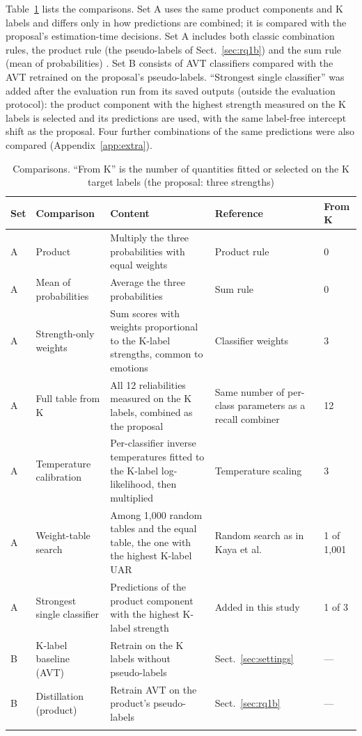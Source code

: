 Table~\ref{tab:comparators} lists the comparisons. Set A uses the same product components and K labels and differs only in how predictions are combined; it is compared with the proposal's estimation-time decisions. Set A includes both classic combination rules, the product rule (the pseudo-labels of Sect.~\ref{sec:rq1b}) and the sum rule (mean of probabilities) \cite{kittler1998}. Set B consists of AVT classifiers compared with the AVT retrained on the proposal's pseudo-labels. ``Strongest single classifier'' was added after the evaluation run from its saved outputs (outside the evaluation protocol): the product component with the highest strength measured on the K labels is selected and its predictions are used, with the same label-free intercept shift as the proposal. Four further combinations of the same predictions were also compared (Appendix~\ref{app:extra}).

\begin{table}[t]
\caption{Comparisons. ``From K'' is the number of quantities fitted or selected on the K target labels (the proposal: three strengths)}\label{tab:comparators}
\footnotesize\setlength{\tabcolsep}{4pt}
\begin{tabular}{@{}lp{2.8cm}p{4.0cm}p{2.5cm}l@{}}
\toprule
Set & Comparison & Content & Reference & From K \\
\midrule
A & Product & Multiply the three probabilities with equal weights & Product rule \cite{kittler1998} & 0 \\
A & Mean of probabilities & Average the three probabilities & Sum rule \cite{kittler1998} & 0 \\
A & Strength-only weights & Sum scores with weights proportional to the K-label strengths, common to emotions & Classifier weights \cite{kuncheva2014} & 3 \\
A & Full table from K & All 12 reliabilities measured on the K labels, combined as the proposal & Same number of per-class parameters as a recall combiner \cite{kuncheva2014} & 12 \\
A & Temperature calibration & Per-classifier inverse temperatures fitted to the K-label log-likelihood, then multiplied & Temperature scaling \cite{guo2017calibration} & 3 \\
A & Weight-table search & Among 1,000 random tables and the equal table, the one with the highest K-label UAR & Random search as in Kaya et al.\ \cite{kaya2017} & 1 of 1,001 \\
A & Strongest single classifier & Predictions of the product component with the highest K-label strength & Added in this study & 1 of 3 \\
B & K-label baseline (AVT) & Retrain on the K labels without pseudo-labels & Sect.~\ref{sec:settings} & --- \\
B & Distillation (product) & Retrain AVT on the product's pseudo-labels & Sect.~\ref{sec:rq1b} & --- \\
\botrule
\end{tabular}
\end{table}

